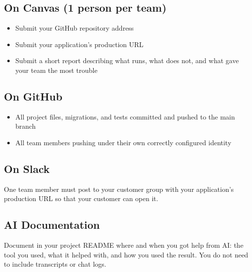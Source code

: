 \documentclass[11pt]{article}
\begin{document}
\subsection*{On Canvas (1 person per team)}
\begin{itemize}
    \item Submit your GitHub repository address
    \item Submit your application's production URL
    \item Submit a short report describing what runs, what does not, and what gave your team the most trouble
\end{itemize}

\subsection*{On GitHub}
\begin{itemize}
    \item All project files, migrations, and tests committed and pushed to the main branch
    \item All team members pushing under their own correctly configured identity
\end{itemize}

\subsection*{On Slack}
One team member must post to your customer group with your application's production URL so that your customer can open it.

\subsection*{AI Documentation}
Document in your project README where and when you got help from AI: the tool you used, what it helped with, and how you used the result. You do not need to include transcripts or chat logs.
\end{document}
